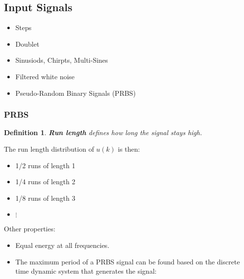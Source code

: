 \documentclass[10pt,a4paper]{scrartcl}
\newtheorem{define}{Definition}
\begin{document}
\begin{multicols*}{2}
\subsection{Input Signals}

\begin{itemize}
\item Steps
\item Doublet
\item Sinusiods, Chirpts, Multi-Sines
\item Filtered white noise
\item Pseudo-Random Binary Signals (PRBS)
\end{itemize}

\subsubsection{PRBS}




\begin{define}
\textbf{Run length} defines how long the signal stays high.
\end{define}

The run length distribution of $u(k)$ is then:

\begin{itemize}
\item[] 1/2 runs of length 1
\item[] 1/4 runs of length 2
\item[] 1/8 runs of length 3
\item[] $\vdots$
\end{itemize}

Other properties:

\begin{itemize}
\item Equal energy at all frequencies.
\item The maximum period of a PRBS signal can be found based on the discrete time dynamic system that generates the signal:


\end{itemize}
\end{multicols*}
\end{document}
